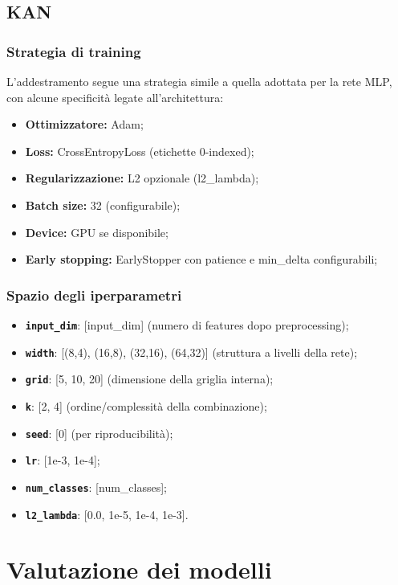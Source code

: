 \documentclass[a4paper,12pt]{report}
\begin{document}
	\subsection{KAN}
	
	\subsubsection{Strategia di training}
	L'addestramento segue una strategia simile a quella adottata per la rete MLP, con alcune specificità legate all'architettura:
	
	\begin{itemize}
		\item \textbf{Ottimizzatore:} Adam;
		\item \textbf{Loss:} CrossEntropyLoss (etichette 0-indexed);
		\item \textbf{Regularizzazione:} L2 opzionale (l2\_lambda);
		\item \textbf{Batch size:} 32 (configurabile);
		\item \textbf{Device:} GPU se disponibile;
		\item \textbf{Early stopping:} EarlyStopper con patience e min\_delta configurabili;
	\end{itemize}
	
	\subsubsection{Spazio degli iperparametri}
	\begin{itemize}
		\item \textbf{\texttt{input\_dim}}: [input\_dim] (numero di features dopo preprocessing);
		\item \textbf{\texttt{width}}: [(8,4), (16,8), (32,16), (64,32)] (struttura a livelli della rete);
		\item \textbf{\texttt{grid}}: [5, 10, 20] (dimensione della griglia interna);
		\item \textbf{\texttt{k}}: [2, 4] (ordine/complessit\`a della combinazione);
		\item \textbf{\texttt{seed}}: [0] (per riproducibilit\`a);
		\item \textbf{\texttt{lr}}: [1e-3, 1e-4];
		\item \textbf{\texttt{num\_classes}}: [num\_classes];
		\item \textbf{\texttt{l2\_lambda}}: [0.0, 1e-5, 1e-4, 1e-3].
	\end{itemize}
	
	\section{Valutazione dei modelli}
	
\end{document}
